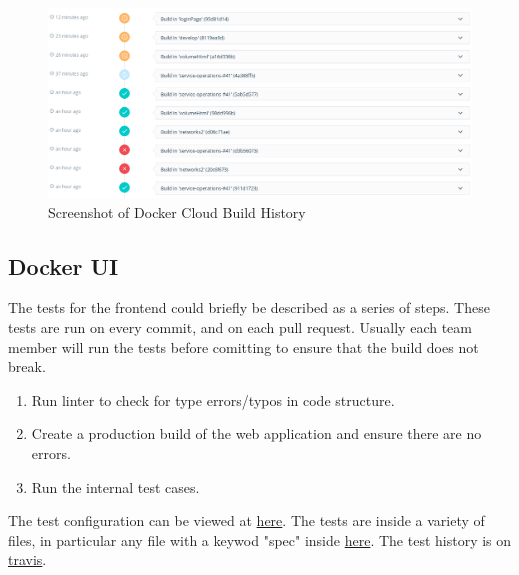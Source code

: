 \documentclass[]{article}
\begin{document}
\begin{figure}[H]
	\centering
	\includegraphics[scale=0.5]{docker_cloud_build_history.png}
	\caption{Screenshot of Docker Cloud Build History}
\end{figure}

\subsection{Docker UI}
The tests for the frontend could briefly be described as a series of steps.
These tests are run on every commit, and on each pull request. Usually each team
member will run the tests before comitting to ensure that the build does not break.

\begin{enumerate}
	\item Run linter to check for type errors/typos in code structure.
	\item Create a production build of the web application and ensure there are no errors.
	\item Run the internal test cases.
\end{enumerate}

The test configuration can be viewed at \href{https://github.com/TripleParity/docker-ui/blob/master/karma.conf.js}{here}.
The tests are inside a variety of files, in particular any file with a keywod "spec" inside \href{https://github.com/TripleParity/docker-ui/tree/master/src/app}{here}.
The test history is on \href{https://travis-ci.org/TripleParity/docker-ui}{travis}.
\end{document}
